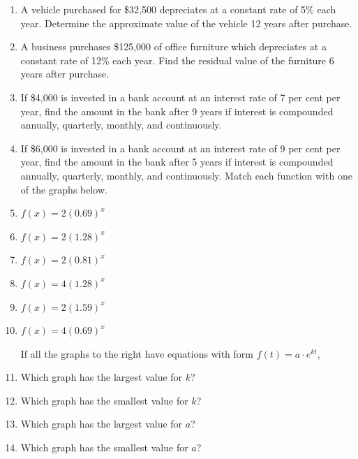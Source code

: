 \begin{enumerate}
\item A vehicle purchased for \$32,500 depreciates at a constant rate of 5\% each year. Determine the approximate value of the vehicle 12 years after purchase.

\item A business purchases \$125,000 of office furniture which depreciates at a constant rate of 12\% each year.  Find the residual value of the furniture 6 years after purchase.

\item If \$4,000 is invested in a bank account at an interest rate of 7 per cent per year, find the amount in the bank after 9 years if interest is compounded annually, quarterly, monthly, and continuously.

\item If \$6,000 is invested in a bank account at an interest rate of 9 per cent per year, find the amount in the bank after 5 years if interest is compounded annually, quarterly, monthly, and continuously.
Match each function with one of the graphs below.

\item $f(x) = 2(0.69)^x$
\item $f(x) = 2(1.28)^x$
\item $f(x) = 2(0.81)^x$
\item $f(x) = 4(1.28)^x$
\item $f(x) = 2(1.59)^x$
\item $f(x) = 4(0.69)^x$

If all the graphs to the right have equations with form $f(t) = a\cdot e^{kt}$,
\item Which graph has the largest value for $k$?
\item  Which graph has the smallest value for $k$?
\item  Which graph has the largest value for $a$?
\item  Which graph has the smallest value for $a$?
\end{enumerate}
